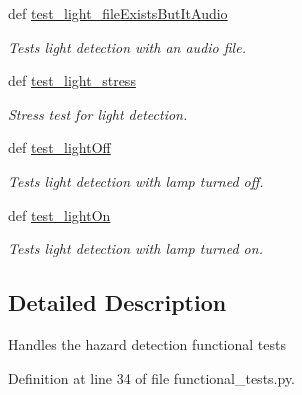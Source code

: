 \begin{DoxyCompactItemize}
def \hyperlink{classfunctional__tests_1_1HazardDetectionFunc_a1998b9621c3986689bdaea5c338666b9}{test\-\_\-light\-\_\-file\-Exists\-But\-It\-Audio}
\begin{DoxyCompactList}\small\item\em Tests light detection with an audio file. \end{DoxyCompactList}\item 
def \hyperlink{classfunctional__tests_1_1HazardDetectionFunc_ad264dece72213c2089d8239f76ab65b9}{test\-\_\-light\-\_\-stress}
\begin{DoxyCompactList}\small\item\em Stress test for light detection. \end{DoxyCompactList}\item 
def \hyperlink{classfunctional__tests_1_1HazardDetectionFunc_a4de4176f5a2fd93c6eaf6218d4c67fed}{test\-\_\-light\-Off}
\begin{DoxyCompactList}\small\item\em Tests light detection with lamp turned off. \end{DoxyCompactList}\item 
def \hyperlink{classfunctional__tests_1_1HazardDetectionFunc_a255a594adedc5a0df26eb70b554f500e}{test\-\_\-light\-On}
\begin{DoxyCompactList}\small\item\em Tests light detection with lamp turned on. \end{DoxyCompactList}\end{DoxyCompactItemize}


\subsection{Detailed Description}
\begin{DoxyVerb}Handles the hazard detection functional tests
\end{DoxyVerb}
 

Definition at line 34 of file functional\-\_\-tests.\-py.




